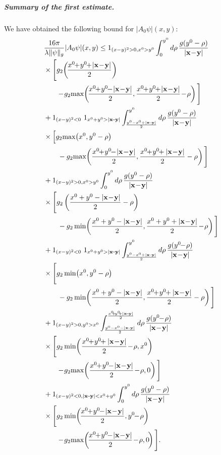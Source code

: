 \documentclass[b5paper,draft,openbib,12pt]{memoir}
\newcommand{\vx}{\mathbf{x}}
\newcommand{\vy}{\mathbf{y}}
\begin{document}
\subparagraph{Summary of the first estimate.} We have 
obtained the following bound for $| A_0 \psi |(x,y)$:
\begin{align}
    &\frac{16\pi}{\lambda\|\psi\|_g}|A_0\psi|(x,y) \le 
    1_{(x-y)^2>0, x^0>y^0} \int_{0}^{y^0} d\rho \, \frac{ g(y^0-\rho)}{|\vx\!-\!\vy|}\nonumber\\
    &\times \Bigg[ g_2\!\left(\!\frac{x^0\!\!+\!y^0\!\! +\! |\vx\!-\!\vy|}{2}\right)\notag\\
    &\quad\quad \!-\!g_2\!\max\!\left(\!\frac{x^0\!\!+\!y^0\!\!-\! |\vx\!-\!\vy|}{2},\frac{x^0\!\!+\!y^0\!\!+ \!|\vx\!-\!\vy|}{2}\!-\!\rho\right)\Bigg]\nonumber\\
    &+ 1_{(x-y)^2<0}~1_{ x^0+y^0>|\vx\!-\!\vy|} \int_{\frac{y^0-x^0+|\vx\!-\!\vy|}{2}}^{y^0} d\rho \, \frac{ g(y^0-\rho)}{|\vx\!-\!\vy|}\nonumber\\
    &\times \Big[ g_2\!\max\!\left(x^0,y^0-\rho\right)\notag\\
    &\quad\quad -g_2\!\max\!\left(\frac{x^0\!\!+\!y^0\!\!-\!|\vx\!-\!\vy|}{2},\frac{x^0\!\!+\!y^0\!\!+|\vx\!-\!\vy|}{2}-\rho\right)\Bigg]\nonumber\\
    &+ 1_{(x-y)^2>0, x^0>y^0} \int_{0}^{y^0} d\rho \, \frac{ g(y^0-\rho)}{|\vx\!-\!\vy|}\nonumber\\
    &\times \Bigg[ g_2\left(\frac{x^0+y^0 - |\vx\!-\!\vy|}{2}-\rho\right)\notag\\
    &\quad\quad -g_2\min\!\left(\frac{x^0+y^0 - |\vx\!-\!\vy|}{2},\frac{x^0+y^0 + |\vx\!-\!\vy|}{2}\!-\!\rho\right)\Bigg]\nonumber\\\nonumber
    &+ 1_{(x-y)^2<0}~1_{ x^0+y^0>|\vx\!-\!\vy|} \int_{\frac{y^0-x^0+|\vx\!-\!\vy|}{2}}^{y^0} d\rho \, \frac{ g(y^0\!\!-\!\rho)}{|\vx\!-\!\vy|}\nonumber\\
    &\times \Bigg[ g_2\min\!\left(x^0,y^0-\rho\right)\notag\\
    &\quad\quad -g_2\min\!\left(\frac{x^0+y^0- |\vx\!-\!\vy|}{2},\frac{x^0\!\!+\!y^0\!\!+ |\vx\!-\!\vy|}{2}-\rho\right)\Bigg]\nonumber\\
    &+1_{(x-y)^2>0,y^0>x^0} \int_{\frac{y^0-x^0-|\vx\!-\!\vy|}{2}}^{\frac{x^0\!\!+\!y^0\!\!+|\vx\!-\!\vy|}{2}}d\rho \, \frac{g(y^0\!\!-\!\rho)}{|\vx\!-\!\vy|}\nonumber\\
    &\times \Bigg[g_2 \min\!\left(\frac{x^0\!\!+\!y^0\!\!+|\vx\!-\!\vy|}{2}\!-\!\rho,x^0\right)\notag\\
    &\quad\quad \!-\!g_2\!\max\!\left( \frac{x^0\!\!+\!y^0\!\!-\!|\vx\!-\!\vy|}{2}\!-\!\rho,0 \right) \Bigg]\nonumber\\
    &+1_{(x-y)^2<0,|\vx\!-\!\vy|<x^0+y^0}
    \int_{0}^{y^0}d\rho \,\frac{g(y^0-\rho)}{|\vx\!-\!\vy|}\nonumber\\
    &\times \Bigg[g_2 \min\!\left(\!\frac{x^0\!\!+\!y^0\!\!-\!|\vx\!-\!\vy|}{2},y^0\!\!-\!\rho\right)\notag\\
    &\quad\quad \!-\!g_2\!\max\!\left( \!\frac{x^0\!\!+\!y^0\!\!-\!|\vx\!-\!\vy|}{2}\!-\!\rho,0\!\right)  \Bigg].
\end{align}
\end{document}

